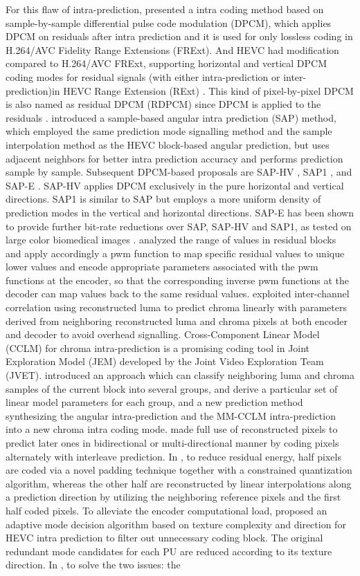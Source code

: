 \documentclass[journal]{IEEEtran}
\begin{document}
For this flaw of intra-prediction, \cite{d} presented a intra coding method based on sample-by-sample differential pulse code modulation (DPCM), which applies DPCM on residuals after intra prediction and it is used for only lossless coding in H.264/AVC Fidelity Range Extensions (FRExt). And HEVC had modification compared to H.264/AVC FRExt, supporting horizontal and vertical DPCM coding modes for residual signals (with either intra-prediction or inter-prediction)in HEVC Range Extension (RExt) \cite{e, h}. This kind of pixel-by-pixel DPCM is also named as residual DPCM (RDPCM) since DPCM is applied to the residuals \cite{i}.
 \cite{09} introduced a sample-based angular intra prediction (SAP) method, which employed the same prediction mode signalling method and the sample interpolation method as the HEVC block-based angular prediction, but uses adjacent neighbors for better intra prediction accuracy and performs prediction sample by sample. Subsequent DPCM-based proposals are SAP-HV \cite{10}, SAP1 \cite{11}, and SAP-E \cite{12}. SAP-HV applies DPCM exclusively in the pure horizontal and vertical directions. SAP1 is similar to SAP but employs a more uniform density of prediction modes in the vertical and horizontal directions. SAP-E has been shown to provide further bit-rate reductions over SAP, SAP-HV and SAP1, as tested on large color biomedical images \cite{12}. \cite{13} analyzed the range of values in residual blocks and apply accordingly a pwm function to map specific residual values to unique lower values and encode appropriate parameters associated with the pwm functions at the encoder, so that the corresponding inverse pwm functions at the decoder can map values back to the same residual values. \cite{14} exploited inter-channel correlation using reconstructed luma to predict chroma linearly with parameters derived from neighboring reconstructed luma and chroma pixels at both encoder and decoder to avoid overhead signalling. Cross-Component Linear Model (CCLM) for chroma intra-prediction is a promising coding tool in Joint Exploration Model (JEM) developed by the Joint Video Exploration Team (JVET). \cite{15} introduced an approach which can classify neighboring luma and chroma samples of the current block into several groups, and derive a particular set of linear model parameters for each group, and a new prediction method synthesizing the angular intra-prediction and the MM-CCLM intra-prediction into a new chroma intra coding mode. \cite{16} made full use of reconstructed pixels to predict later ones in bidirectional or multi-directional manner by coding pixels alternately with interleave prediction. In \cite{17}, to reduce residual energy, half pixels are coded via a novel padding technique together with a constrained quantization algorithm, whereas the other half are reconstructed by linear interpolations along a prediction direction by utilizing the neighboring reference pixels and the first half coded pixels. To alleviate the encoder computational load, \cite{18} proposed an adaptive mode decision algorithm based on texture complexity and direction for HEVC intra prediction to filter out unnecessary coding block. The original redundant mode candidates for each PU are reduced according to its texture direction. In \cite{19}, to solve the two issues: the 
\end{document}
